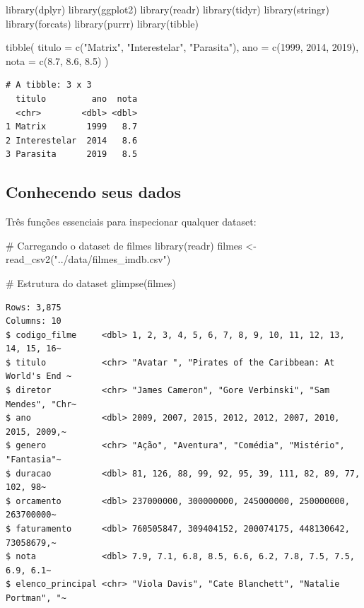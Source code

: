 \documentclass[
  letterpaper,
]{scrbook}
\newenvironment{Shaded}{\begin{snugshade}}{\end{snugshade}}
\newcommand{\AttributeTok}[1]{\textcolor[rgb]{0.40,0.45,0.13}{#1}}
\newcommand{\CommentTok}[1]{\textcolor[rgb]{0.37,0.37,0.37}{#1}}
\newcommand{\DecValTok}[1]{\textcolor[rgb]{0.68,0.00,0.00}{#1}}
\newcommand{\FloatTok}[1]{\textcolor[rgb]{0.68,0.00,0.00}{#1}}
\newcommand{\FunctionTok}[1]{\textcolor[rgb]{0.28,0.35,0.67}{#1}}
\newcommand{\NormalTok}[1]{\textcolor[rgb]{0.00,0.23,0.31}{#1}}
\newcommand{\OtherTok}[1]{\textcolor[rgb]{0.00,0.23,0.31}{#1}}
\newcommand{\StringTok}[1]{\textcolor[rgb]{0.13,0.47,0.30}{#1}}
\begin{document}
\begin{Shaded}
\begin{Highlighting}[]
\FunctionTok{library}\NormalTok{(dplyr)}
\FunctionTok{library}\NormalTok{(ggplot2)}
\FunctionTok{library}\NormalTok{(readr)}
\FunctionTok{library}\NormalTok{(tidyr)}
\FunctionTok{library}\NormalTok{(stringr)}
\FunctionTok{library}\NormalTok{(forcats)}
\FunctionTok{library}\NormalTok{(purrr)}
\FunctionTok{library}\NormalTok{(tibble)}

\FunctionTok{tibble}\NormalTok{(}
  \AttributeTok{titulo =} \FunctionTok{c}\NormalTok{(}\StringTok{"Matrix"}\NormalTok{, }\StringTok{"Interestelar"}\NormalTok{, }\StringTok{"Parasita"}\NormalTok{),}
  \AttributeTok{ano =} \FunctionTok{c}\NormalTok{(}\DecValTok{1999}\NormalTok{, }\DecValTok{2014}\NormalTok{, }\DecValTok{2019}\NormalTok{),}
  \AttributeTok{nota =} \FunctionTok{c}\NormalTok{(}\FloatTok{8.7}\NormalTok{, }\FloatTok{8.6}\NormalTok{, }\FloatTok{8.5}\NormalTok{)}
\NormalTok{)}
\end{Highlighting}
\end{Shaded}

\begin{verbatim}
# A tibble: 3 x 3
  titulo         ano  nota
  <chr>        <dbl> <dbl>
1 Matrix        1999   8.7
2 Interestelar  2014   8.6
3 Parasita      2019   8.5
\end{verbatim}

\subsection{Conhecendo seus dados}\label{conhecendo-seus-dados}

Três funções essenciais para inspecionar qualquer dataset:

\begin{Shaded}
\begin{Highlighting}[]
\CommentTok{\# Carregando o dataset de filmes}
\FunctionTok{library}\NormalTok{(readr)}
\NormalTok{filmes }\OtherTok{\textless{}{-}} \FunctionTok{read\_csv2}\NormalTok{(}\StringTok{"../data/filmes\_imdb.csv"}\NormalTok{)}

\CommentTok{\# Estrutura do dataset}
\FunctionTok{glimpse}\NormalTok{(filmes)}
\end{Highlighting}
\end{Shaded}

\begin{verbatim}
Rows: 3,875
Columns: 10
$ codigo_filme     <dbl> 1, 2, 3, 4, 5, 6, 7, 8, 9, 10, 11, 12, 13, 14, 15, 16~
$ titulo           <chr> "Avatar ", "Pirates of the Caribbean: At World's End ~
$ diretor          <chr> "James Cameron", "Gore Verbinski", "Sam Mendes", "Chr~
$ ano              <dbl> 2009, 2007, 2015, 2012, 2012, 2007, 2010, 2015, 2009,~
$ genero           <chr> "Ação", "Aventura", "Comédia", "Mistério", "Fantasia"~
$ duracao          <dbl> 81, 126, 88, 99, 92, 95, 39, 111, 82, 89, 77, 102, 98~
$ orcamento        <dbl> 237000000, 300000000, 245000000, 250000000, 263700000~
$ faturamento      <dbl> 760505847, 309404152, 200074175, 448130642, 73058679,~
$ nota             <dbl> 7.9, 7.1, 6.8, 8.5, 6.6, 6.2, 7.8, 7.5, 7.5, 6.9, 6.1~
$ elenco_principal <chr> "Viola Davis", "Cate Blanchett", "Natalie Portman", "~
\end{verbatim}
\end{document}
